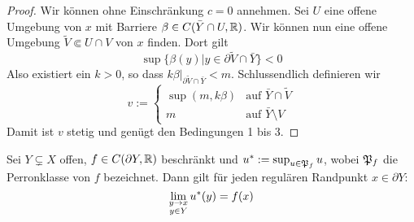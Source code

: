 \begin{proof}
  Wir können ohne Einschränkung $c = 0$ annehmen. Sei $U$ eine offene Umgebung von $x$ mit Barriere $\beta \in C(\bar
  Y \cap U, \mathbb{R})$. Wir können nun eine offene Umgebung $\tilde V \Subset U \cap V$
  von $x$ finden. Dort gilt
  \[
  \sup\{\beta(y)| y \in \partial \tilde V \cap \bar Y \} < 0
  \]
  Also existiert ein $k > 0$, so dass $k\beta|_{\partial \tilde V \cap
    \bar Y} < m$.
  Schlussendlich definieren wir
  \[
  v :=
  \begin{cases}
    \sup(m, k\beta) & \text{auf } \bar Y \cap \tilde V\\
    m & \text{auf } \bar Y \setminus V
  \end{cases}
  \]
  Damit ist $v$ stetig und genügt den Bedingungen 1 bis 3.
\end{proof}

\begin{lemma}
  Sei $Y \subsetneq X$ offen, $f \in C(\partial Y, \mathbb{R})$ beschränkt und
  $u^\ast := \sup_{u \in \mathfrak{P}_f}u$, wobei $\mathfrak{P}_f$ die Perronklasse von
  $f$ bezeichnet. Dann gilt für jeden regulären Randpunkt $x \in \partial Y$:
  \[
  \lim_{\substack{y \rightarrow x\\y \in Y}} u^\ast(y) = f(x)
  \]
\end{lemma}

